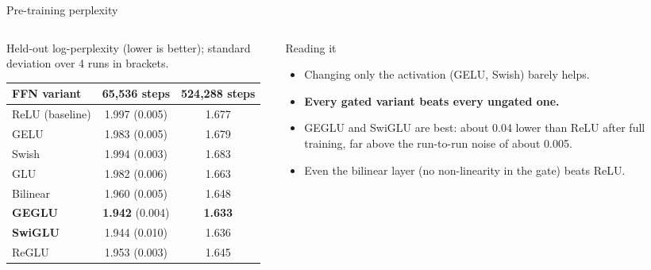 \documentclass[aspectratio=169,11pt]{beamer}
\begin{document}
\begin{frame}{Pre-training perplexity}
  \begin{columns}[T]
    \begin{column}{0.52\textwidth}
      \footnotesize
      Held-out log-perplexity (lower is better); standard deviation over 4 runs in brackets.
      \vspace{1mm}

      \begin{tabular}{@{}lcc@{}}
        \toprule
        FFN variant & 65,536 steps & 524,288 steps\\
        \midrule
        ReLU (baseline) & 1.997 (0.005) & 1.677\\
        GELU & 1.983 (0.005) & 1.679\\
        Swish & 1.994 (0.003) & 1.683\\
        GLU & 1.982 (0.006) & 1.663\\
        Bilinear & 1.960 (0.005) & 1.648\\
        \textbf{GEGLU} & \textbf{1.942} (0.004) & \textbf{1.633}\\
        \textbf{SwiGLU} & 1.944 (0.010) & 1.636\\
        ReGLU & 1.953 (0.003) & 1.645\\
        \bottomrule
      \end{tabular}
    \end{column}
    \begin{column}{0.44\textwidth}
      \begin{exampleblock}{Reading it}
        \small
        \begin{itemize}
          \item Changing only the activation (GELU, Swish) barely helps.
          \item \textbf{Every gated variant beats every ungated one.}
          \item GEGLU and SwiGLU are best: about 0.04 lower than ReLU after full training, far above the run-to-run noise of about 0.005.
          \item Even the bilinear layer (no non-linearity in the gate) beats ReLU.
        \end{itemize}
      \end{exampleblock}
    \end{column}
  \end{columns}
\end{frame}
\end{document}
